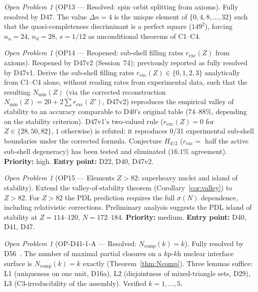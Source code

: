 \documentclass[11pt,a4paper]{article}
\theoremstyle{plain}
\theoremstyle{definition}
\theoremstyle{remark}
\newtheorem{openproblem}[theorem]{Open Problem}
\newcommand{\sigmaN}{\sigma(N)}
\begin{document}
\begin{openproblem}[OP13 --- Resolved: spin--orbit splitting from axioms]
\label{op:spinorbit}
\textcolor{proofblue}{Fully resolved by D47.} The value $\Delta n = 4$ is the unique element of $\{0,4,8,\ldots,32\}$ such that the quasi-completeness discriminant is a perfect square ($149^2$), forcing $n_u=24$, $n_d=28$, $s=1/12$ as unconditional theorems of C1--C4.
\end{openproblem}

\begin{openproblem}[OP14 --- Reopened: sub-shell filling rates $r_{\mathrm{exc}}(Z)$ from axioms]
\label{op:filling}
\textcolor{negativered}{Reopened by D47v2 (Session~74); previously reported as fully resolved by D47v1.} Derive the sub-shell filling rates $r_{\mathrm{exc}}(Z)\in\{0,1,2,3\}$ analytically from C1--C4 alone, without reading rates from experimental data, such that the resulting $N_{\min}(Z)$ (via the corrected reconstruction $N_{\min}(Z)=20+2\sum r_{\mathrm{exc}}(Z')$, D47v2) reproduces the empirical valley of stability to an accuracy comparable to D40's original table ($74$--$88\%$, depending on the stability criterion). D47v1's two-valued rule ($r_{\mathrm{exc}}(Z)=0$ for $Z\in\{28,50,82\}$, $1$ otherwise) is refuted: it reproduces 0/31 experimental sub-shell boundaries under the corrected formula. Conjecture $H_{d/2}$ ($r_{\mathrm{exc}}=$ half the active sub-shell degeneracy) has been tested and eliminated ($16.1\%$ agreement). \textbf{Priority:} high. \textbf{Entry point:} D22, D40, D47v2.
\end{openproblem}

\begin{openproblem}[OP15 --- Elements $Z>82$: superheavy nuclei and island of stability]
\label{op:superheavy}
Extend the valley-of-stability theorem (Corollary~\ref{cor:valley}) to $Z>82$. For $Z>82$ the PDL prediction requires the full $\sigmaN$ dependence, including relativistic corrections. Preliminary analysis suggests the PDL island of stability at $Z=114$--$120$, $N=172$--$184$. \textbf{Priority:} medium. \textbf{Entry point:} D40, D41, D47.
\end{openproblem}

\begin{openproblem}[OP-D41-1-A --- Resolved: $N_{\mathrm{comp}}(k)=k$]
\label{op:Ncomp}
\textcolor{proofblue}{Fully resolved by D56~\cite{D56}.} The number of maximal partial closures on a $k\mathrm{p}$-$k\mathrm{h}$ nuclear interface surface is $N_{\mathrm{comp}}(k)=k$ exactly (Theorem~\ref{thm:Ncomp}). Three lemmas suffice: L1 (uniqueness on one unit, D16a), L2 (disjointness of mixed-triangle sets, D29), L3 (C3-irreducibility of the assembly). Verified $k=1,\ldots,5$.
\end{openproblem}
\end{document}
